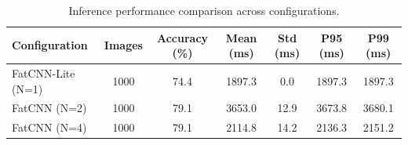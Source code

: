 \begin{table}[htbp]
\centering
\caption{Inference performance comparison across configurations.}
\label{tab:summary}
\begin{tabular}{lcccccc}
\toprule
Configuration & Images & Accuracy (\%) & Mean (ms) & Std (ms) & P95 (ms) & P99 (ms) \\
\midrule
FatCNN-Lite (N=1) & 1000 & 74.4 & 1897.3 & 0.0 & 1897.3 & 1897.3 \\
FatCNN (N=2) & 1000 & 79.1 & 3653.0 & 12.9 & 3673.8 & 3680.1 \\
FatCNN (N=4) & 1000 & 79.1 & 2114.8 & 14.2 & 2136.3 & 2151.2 \\
\bottomrule
\end{tabular}
\end{table}
